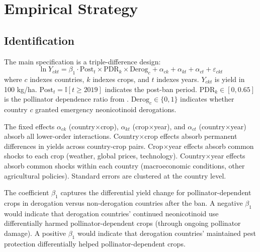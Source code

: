 \documentclass[12pt]{article}
\newcommand{\ind}{\mathbb{I}}
\begin{document}
\section{Empirical Strategy}

\subsection{Identification}

The main specification is a triple-difference design:
\begin{equation}
\ln Y_{ckt} = \beta_1 \cdot \text{Post}_t \times \text{PDR}_k \times \text{Derog}_c + \alpha_{ck} + \alpha_{kt} + \alpha_{ct} + \varepsilon_{ckt}
\label{eq:ddd}
\end{equation}
where $c$ indexes countries, $k$ indexes crops, and $t$ indexes years. $Y_{ckt}$ is yield in 100 kg/ha. $\text{Post}_t = \ind[t \geq 2019]$ indicates the post-ban period. $\text{PDR}_k \in [0, 0.65]$ is the pollinator dependence ratio from \citet{klein2007importance}. $\text{Derog}_c \in \{0,1\}$ indicates whether country $c$ granted emergency neonicotinoid derogations.

The fixed effects $\alpha_{ck}$ (country$\times$crop), $\alpha_{kt}$ (crop$\times$year), and $\alpha_{ct}$ (country$\times$year) absorb all lower-order interactions. Country$\times$crop effects absorb permanent differences in yields across country-crop pairs. Crop$\times$year effects absorb common shocks to each crop (weather, global prices, technology). Country$\times$year effects absorb common shocks within each country (macroeconomic conditions, other agricultural policies). Standard errors are clustered at the country level.

The coefficient $\beta_1$ captures the differential yield change for pollinator-dependent crops in derogation versus non-derogation countries after the ban. A negative $\beta_1$ would indicate that derogation countries' continued neonicotinoid use differentially harmed pollinator-dependent crops (through ongoing pollinator damage). A positive $\beta_1$ would indicate that derogation countries' maintained pest protection differentially helped pollinator-dependent crops.
\end{document}
